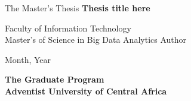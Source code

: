 \begin{titlepage}
    \begin{center}
    	\textmd{\large The Master's Thesis}  
        \vfill
        \textbf{\fontsize{21}{11}\selectfont Thesis title here}  
        \vfill
        
        \textnormal{\large Faculty of Information Technology\\Master's of Science in Big Data Analytics} 
        \vfill
        \textnormal{\Large Author}
        \vfill
        \vfill
        
        
        \textnormal{\large Month, Year}
        
        \textbf{\Large The Graduate Program \\ Adventist University of Central Africa}
        \vfill
    \end{center}
\end{titlepage}